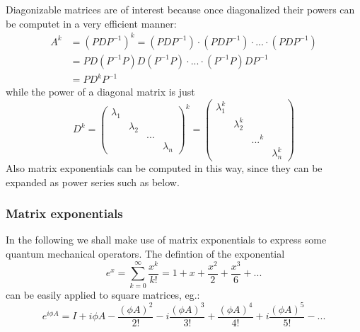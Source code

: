 \documentclass[11.5pt,a4paper]{article}
\begin{document}
Diagonizable matrices are of interest because once diagonalized their powers can be computet in a very efficient manner:
\begin{align*}
 A^k & = (P D P^{-1})^k = ( P D P^{-1}) \cdot ( P D P^{-1}) \cdot ... \cdot (P D P^{-1}) \\
    & = P D (P^{-1} P) D (P^{-1} P) \cdot ... \cdot (P^{-1} P) D P^{-1} \\
    & = P D^k P^{-1}
\end{align*}
while the power of a diagonal matrix is just
\begin{equation}
 D^k = \begin{pmatrix} 
		\lambda_1 & & & \\
		& \lambda_2 & & \\
		& & \text{...} & \\
		& & & \lambda_n
              \end{pmatrix}^k = 
	\begin{pmatrix} 
		\lambda_1^k & & & \\
		& \lambda_2^k & & \\
		& & \text{...}^k & \\
		& & & \lambda_n^k
              \end{pmatrix}
\end{equation}
Also matrix exponentials can be computed in this way, since they can be expanded as power series such as below.

\subsubsection{Matrix exponentials}
In the following we shall make use of matrix exponentials to express some quantum mechanical operators. The defintion of the exponential
\begin{equation}
 e^x = \sum_{k=0}^\infty \frac{x^k}{k!} = 1 + x + \frac{x^2}{2} + \frac{x^3}{6} + ...
\end{equation}
can be easily applied to square matrices, eg.:
\begin{equation}
 e^{i \phi A } = I + i \phi A - \frac{(\phi A)^2}{2!} - i \frac{(\phi A)^3}{3!} + \frac{(\phi A)^4}{4!} + i \frac{(\phi A)^5}{5!} - ...
\end{equation}

\end{document}
